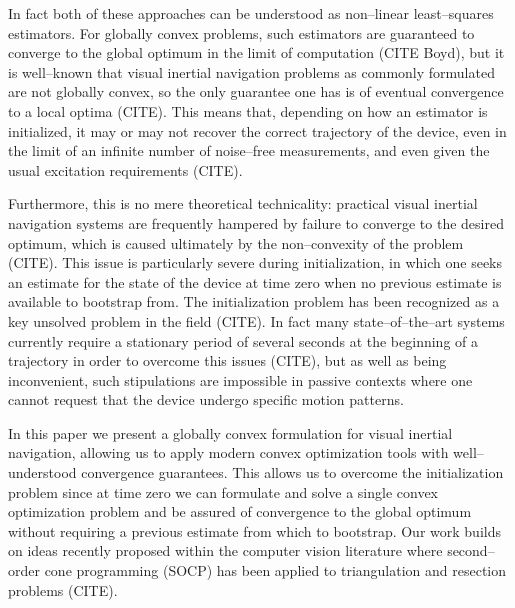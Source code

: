 In fact both of these approaches can be understood as non--linear least--squares estimators. For globally convex problems, such estimators are guaranteed to converge to the global optimum in the limit of computation (CITE Boyd), but it is well--known that visual inertial navigation problems as commonly formulated are not globally convex, so the only guarantee one has is of eventual convergence to a local optima (CITE). This means that, depending on how an estimator is initialized, it may or may not recover the correct trajectory of the device, even in the limit of an infinite number of noise--free measurements, and even given the usual excitation requirements (CITE).

Furthermore, this is no mere theoretical technicality: practical visual inertial navigation systems are frequently hampered by failure to converge to the desired optimum, which is caused ultimately by the non--convexity of the problem (CITE). This issue is particularly severe during initialization, in which one seeks an estimate for the state of the device at time zero when no previous estimate is available to bootstrap from. The initialization problem has been recognized as a key unsolved problem in the field (CITE). In fact many state--of--the--art systems currently require a stationary period of several seconds at the beginning of a trajectory in order to overcome this issues (CITE), but as well as being inconvenient, such stipulations are impossible in passive contexts where one cannot request that the device undergo specific motion patterns.

In this paper we present a globally convex formulation for visual inertial navigation, allowing us to apply modern convex optimization tools with well--understood convergence guarantees. This allows us to overcome the initialization problem since at time zero we can formulate and solve a single convex optimization problem and be assured of convergence to the global optimum without requiring a previous estimate from which to bootstrap. Our work builds on ideas recently proposed within the computer vision literature where second--order cone programming (SOCP) has been applied to triangulation and resection problems (CITE).


